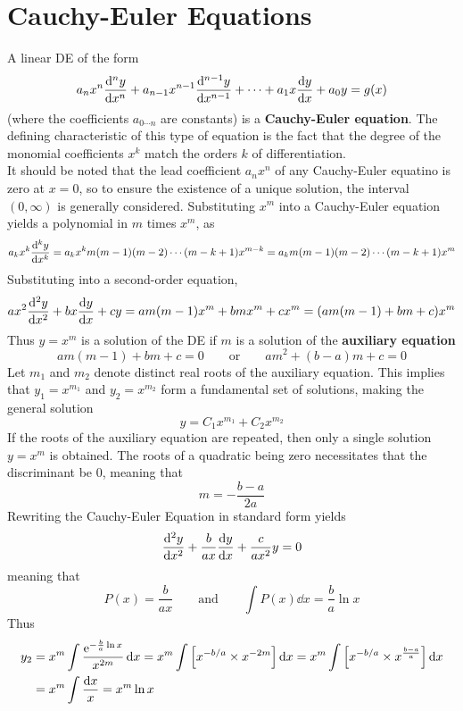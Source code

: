 \documentclass[./Differential Equations]{subfiles}
\begin{document}
	\section{Cauchy-Euler Equations}
			A linear DE of the form
				\[a_nx^n\dv[n]{y}{x} + a_{n - 1}x^{n - 1}\dv[n - 1]{y}{x} + \cdots + a_1x\dv{y}{x} + a_0y = g(x)\]
				(where the coefficients \(a_{0 \cdots n}\) are constants) is a \textbf{Cauchy-Euler equation}. The defining characteristic of this type of equation is the fact that the degree of the monomial coefficients \(x^k\) match the orders \(k\) of differentiation. \\
			It should be noted that the lead coefficient \(a_nx^n\) of any Cauchy-Euler equatino is zero at \(x = 0\), so to ensure the existence of a unique solution, the interval \((0, \infty)\) is generally considered.
			Substituting \(x^m\) into a Cauchy-Euler equation yields a polynomial in \(m\) times \(x^m\), as
				\[
					a_kx^k\dv[k]{y}{x} 
						= a_kx^km(m - 1)(m - 2)\cdots(m - k + 1)x^{m - k} 
						= a_km(m - 1)(m - 2)\cdots(m - k + 1)x^m
				\]
				Substituting into a second-order equation,
				\[
					ax^2\dv[2]{y}{x} + bx\dv{y}{x} + cy
						= am(m - 1)x^m + bmx^m + cx^m
						= (am(m - 1) + bm + c)x^m
				\]
				Thus \(y = x^m\) is a solution of the DE if \(m\) is a solution of the \textbf{auxiliary equation}
					\[
						am(m - 1) + bm + c = 0 \qquad \text{or} \qquad
						am^2 + (b - a)m + c = 0
					\]
			Let \(m_1\) and \(m_2\) denote distinct real roots of the auxiliary equation. This implies that \(y_1 = x^{m_1}\) and \(y_2 = x^{m_2}\) form a fundamental set of solutions, making the general solution
				\[y = C_1x^{m_1} + C_2x^{m_2}\]
			If the roots of the auxiliary equation are repeated, then only a single solution \(y = x^m\) is obtained. The roots of a quadratic being zero necessitates that the discriminant be 0, meaning that
				\[m = -\frac{b - a}{2a}\]
				Rewriting the Cauchy-Euler Equation in standard form yields
				\[\dv[2]{y}{x} + \frac{b}{ax}\dv{y}{x} + \frac{c}{ax^2}y = 0\]
				meaning that
				\[
					P(x) = \frac{b}{ax} \qquad \text{and} \qquad
					\int P(x) \dd{x} = \frac{b}{a}\ln{x}
				\]
				Thus
				\begin{align*}
					y_2 &= x^m\int \frac{\text{e}^{-\frac{b}{a}\ln x}}{x^{2m}} \dd{x} 
							= x^m\int\left[x^{-b/a} \times x^{-2m}\right]\dd{x} 
							= x^m\int\left[x^{-b/a} \times x^{\frac{b - a}{a}}\right]\dd{x} \\
						&= x^m\int \frac{\dd{x}}{x}
								= x^m\ln{x}
				\end{align*}
\end{document}
